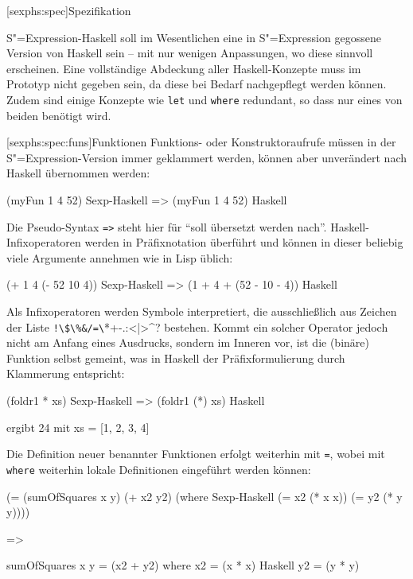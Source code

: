 \documentclass[11pt, a4paper, bibgerm]{scrbook}
\newenvironment{DIFnomarkup}{}{}
\newcommand\icode[1]{\lstinline?#1?}
\newcommand\lsection{}
\newcommand\lsubsection{}
\newcommand{\sexp}{S"=Expression}
\begin{document}
\lsection[sexphs:spec]{Spezifikation}

\sexp{}-Haskell soll im Wesentlichen eine in \sexp{} gegossene Version
von Haskell sein -- mit nur wenigen Anpassungen, wo diese sinnvoll
erscheinen. Eine vollständige Abdeckung aller Haskell-Konzepte muss im
Prototyp nicht gegeben sein, da diese bei Bedarf nachgepflegt werden
können. Zudem sind einige Konzepte wie \icode{let} und \icode{where}
redundant, so dass nur eines von beiden benötigt wird. 

\lsubsection[sexphs:spec:funs]{Funktionen}
Funktions- oder Konstruktoraufrufe müssen in der \sexp{}-Version immer
geklammert werden, können aber unverändert nach Haskell übernommen
werden:
\begin{DIFnomarkup}\begin{code}
(myFun 1 4 52)              Sexp-Haskell
=>
(myFun 1 4 52)              Haskell
\end{code}\end{DIFnomarkup}
Die Pseudo-Syntax \icode{=>} steht hier für ``soll übersetzt werden
nach''.  Haskell-Infixoperatoren werden in Präfixnotation überführt und
können in dieser beliebig viele Argumente annehmen wie in Lisp üblich:
\begin{DIFnomarkup}\begin{code}
(+ 1 4 (- 52 10 4))         Sexp-Haskell
=>
(1 + 4 + (52 - 10 - 4))     Haskell
\end{code}\end{DIFnomarkup}
Als Infixoperatoren werden Symbole interpretiert, die ausschließlich
aus Zeichen der Liste \icode{!\$\%&/=\?*+-.:<|>^}
bestehen. Kommt ein solcher Operator jedoch nicht am Anfang eines
Ausdrucks, sondern im Inneren vor, ist die (binäre) Funktion selbst
gemeint, was in Haskell der Präfixformulierung durch Klammerung
entspricht:
\begin{DIFnomarkup}\begin{code}
(foldr1 * xs)               Sexp-Haskell
=>
(foldr1 (*) xs)             Haskell

ergibt 24 mit xs = [1, 2, 3, 4]
\end{code}\end{DIFnomarkup}
Die Definition neuer benannter Funktionen erfolgt weiterhin mit
\icode{=}, wobei mit \icode{where} weiterhin lokale Definitionen
eingeführt werden können:
\begin{DIFnomarkup}\begin{code}
(= (sumOfSquares x y)
   (+ x2 y2)
 (where                     Sexp-Haskell
  (= x2 (* x x))
  (= y2 (* y y))))

=>

sumOfSquares x y = (x2 + y2)
  where
    x2 = (x * x)            Haskell
    y2 = (y * y)
\end{code}\end{DIFnomarkup}
\end{document}
